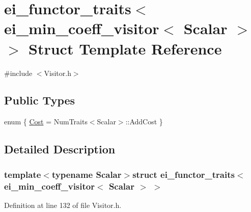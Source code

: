 \hypertarget{structei__functor__traits_3_01ei__min__coeff__visitor_3_01_scalar_01_4_01_4}{\section{ei\-\_\-functor\-\_\-traits$<$ ei\-\_\-min\-\_\-coeff\-\_\-visitor$<$ Scalar $>$ $>$ Struct Template Reference}
\label{structei__functor__traits_3_01ei__min__coeff__visitor_3_01_scalar_01_4_01_4}
}


{\ttfamily \#include $<$Visitor.\-h$>$}

\subsection*{Public Types}
\begin{DoxyCompactItemize}
\item 
enum \{ \hyperlink{structei__functor__traits_3_01ei__min__coeff__visitor_3_01_scalar_01_4_01_4_a2cae70a7c1420820eec471516284b3eba5445646f5b30086fe41893963b075e42}{Cost} = Num\-Traits$<$Scalar$>$\-:\-:Add\-Cost
 \}
\end{DoxyCompactItemize}


\subsection{Detailed Description}
\subsubsection*{template$<$typename Scalar$>$struct ei\-\_\-functor\-\_\-traits$<$ ei\-\_\-min\-\_\-coeff\-\_\-visitor$<$ Scalar $>$ $>$}



Definition at line 132 of file Visitor.\-h.



